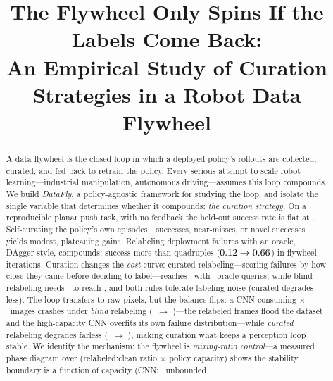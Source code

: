 \documentclass[conference]{IEEEtran}
\begin{document}
\title{The Flywheel Only Spins If the Labels Come Back:\\ An Empirical Study of Curation Strategies in a Robot Data Flywheel}

\author{
}

\maketitle

\begin{abstract}
A data flywheel is the closed loop in which a deployed policy's rollouts are
collected, curated, and fed back to retrain the policy. Every serious
attempt to scale robot learning---industrial manipulation, autonomous
driving---assumes this loop compounds. We build \emph{DataFly}, a
policy-agnostic framework for studying the loop, and isolate the single
variable that determines whether it compounds: \emph{the curation
strategy}. On a reproducible planar push task, with no feedback the
held-out success rate is flat at \baseSuccess. Self-curating the policy's
own episodes---successes, near-misses, or novel successes---yields modest,
plateauing gains. Relabeling deployment failures with an oracle,
DAgger-style, compounds: success more than quadruples
($0.12 \rightarrow 0.66$) in \emph{\numIter} flywheel
iterations. Curation changes the \emph{cost} curve: curated
relabeling---scoring failures by how close they came before deciding to
label---reaches \curatedFinal\ with \curatedQueries\ oracle queries, while
blind relabeling needs \blindQueries\ to reach \relabelFinal, and both
rules tolerate labeling noise (curated degrades less). The loop transfers
to raw pixels, but the balance flips: a CNN consuming
\visionImg$\times$\visionImg\ images crashes under \emph{blind}
relabeling (\visionRelabelFirst\ $\rightarrow$ \visionRelabelFinal)---the
relabeled frames flood the dataset and the high-capacity CNN overfits its
own failure distribution---while \emph{curated} relabeling degrades farless
(\visionCuratedFirst\ $\rightarrow$ \visionCuratedFinal), making
curation what keeps a perception loop stable. We identify the mechanism:
the flywheel is \emph{mixing-ratio control}---a measured phase diagram
over (relabeled:clean ratio $\times$ policy capacity) shows the stability
boundary is a function of capacity (CNN: \mixBlindFinal\ unbounded

\end{abstract}
\end{document}
